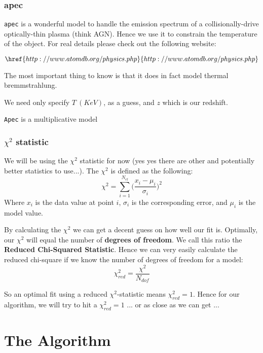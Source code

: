 \documentclass[11pt,letterpaper]{article}
\begin{document}
\subsubsection{apec}
\texttt{apec} is a wonderful model to handle the emission spectrum of a collisionally-drive optically-thin plasma (think AGN). Hence we use it to constrain the temperature of the object. For real details please check out the following website:

$$\href{http://www.atomdb.org/physics.php}{http://www.atomdb.org/physics.php} $$

The most important thing to know is that it does in fact model thermal bremmstrahlung. 

We need only  specify $T \ (KeV)$, as a guess, and $z$ which is our redshift.

\texttt{Apec} is a multiplicative model

\subsubsection{$\chi^2$ statistic}
We will be using the $\chi^2$ statistic for now (yes yes there are other and potentially better statistics to use...). The $\chi^2$ is defined as the following:
\begin{equation}
	\chi^2 = \sum_{i=1}^{N_{el}} \Bigg(  \frac{x_i-\mu_i}{\sigma_i}  \Bigg)^2
\end{equation}
Where $x_i$ is the data value at point $i$, $\sigma_i$ is the corresponding error, and $\mu_i$ is 
the model value.

By calculating the $\chi^2$ we can get a decent  guess on how well our fit is. Optimally, our $\chi^2$ will equal the number of \textbf{degrees of freedom}. We call this ratio the \textbf{Reduced Chi-Squared Statistic}. Hence we can very easily calculate the reduced chi-square if we know the number of degrees of freedom for a model:
\begin{equation}
	\chi^2_{red} = \frac{\chi^2}{N_{dof}}
\end{equation}

So an optimal fit using a reduced $\chi^2$-statistic means $\chi^2_{red} = 1$. Hence for our algorithm, we will try to hit a $\chi^2_{red} = 1$ ... or as close as we can get ... 



\section{The Algorithm}
\end{document}
